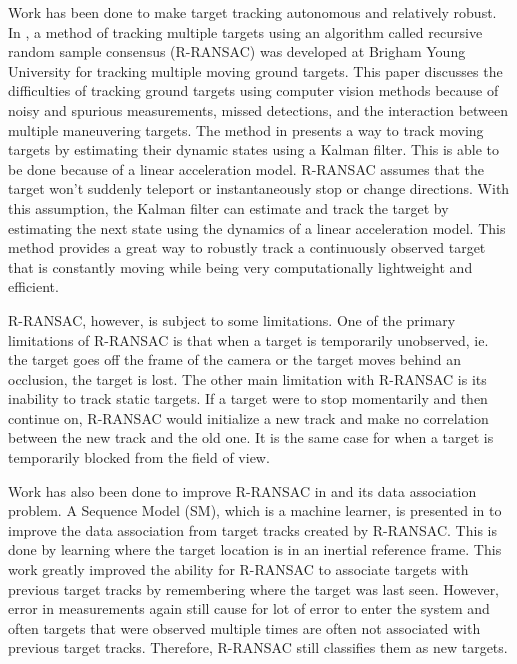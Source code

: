\documentclass[letterpaper, 10 pt, conference]{ieeeconf}  %
\begin{document}
Work has been done to make target tracking autonomous and relatively robust. In \cite{niedfeldt2014multiple}, a method of tracking multiple targets using an algorithm called recursive random sample consensus (R-RANSAC) was developed at Brigham Young University for tracking multiple moving ground targets. This paper discusses the difficulties of tracking ground targets using computer vision methods because of noisy and spurious measurements, missed detections, and the interaction between multiple maneuvering targets. The method in \cite{niedfeldt2014multiple} presents a way to track moving targets by estimating their dynamic states using a Kalman filter. This is able to be done because of a linear acceleration model. R-RANSAC assumes that the target won't suddenly teleport or instantaneously stop or change directions. With this assumption, the Kalman filter can estimate and track the target by estimating the next state using the dynamics of a linear acceleration model. This method provides a great way to robustly track a continuously observed target that is constantly moving while being very computationally lightweight and efficient.

R-RANSAC, however, is subject to some limitations. One of the primary limitations of R-RANSAC is that when a target is temporarily unobserved, ie. the target goes off the frame of the camera or the target moves behind an occlusion, the target is lost. The other main limitation with R-RANSAC is its inability to track static targets. If a target were to stop momentarily and then continue on, R-RANSAC would initialize a new track and make no correlation between the new track and the old one. It is the same case for when a target is temporarily blocked from the field of view.

Work has also been done to improve R-RANSAC in \cite{ingersoll2015vision} and its data association problem. A Sequence Model (SM), which is a machine learner, is presented in \cite{ingersoll2015vision} to improve the data association from target tracks created by R-RANSAC. This is done by learning where the target location is in an inertial reference frame. This work greatly improved the ability for R-RANSAC to associate targets with previous target tracks by remembering where the target was last seen. However, error in measurements again still cause for lot of error to enter the system and often targets that were observed multiple times are often not associated with previous target tracks. Therefore, R-RANSAC still classifies them as new targets. 
\end{document}
